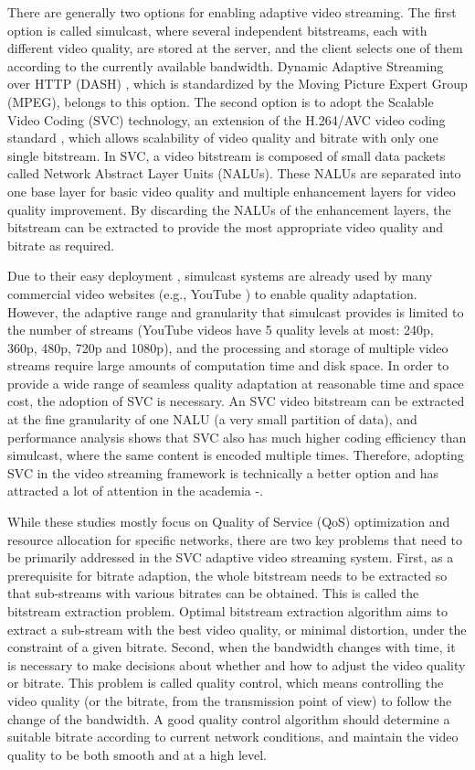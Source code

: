 \documentclass[journal]{IEEEtran}
\begin{document}
There are generally two options for enabling adaptive video streaming. The first option is called simulcast, where several independent bitstreams, each with different video quality, are stored at the server, and the client selects one of them according to the currently available bandwidth. Dynamic Adaptive Streaming over HTTP (DASH) \cite{DASH}, which is standardized by the Moving Picture Expert Group (MPEG), belongs to this option. The second option is to adopt the Scalable Video Coding (SVC) \cite{SVC} technology, an extension of the H.264/AVC video coding standard \cite{SVCOverview}, which allows scalability of video quality and bitrate with only one single bitstream. In SVC, a video bitstream is composed of small data packets called Network Abstract Layer Units (NALUs). These NALUs are separated into one base layer for basic video quality and multiple enhancement layers for video quality improvement. By discarding the NALUs of the enhancement layers, the bitstream can be extracted to provide the most appropriate video quality and bitrate as required.

Due to their easy deployment \cite{Bouten14}, simulcast systems are already used by many commercial video websites (e.g., YouTube \cite{YouTube}) to enable quality adaptation. However, the adaptive range and granularity that simulcast provides is limited to the number of streams (YouTube videos have 5 quality levels at most: 240p, 360p, 480p, 720p and 1080p), and the processing and storage of multiple video streams require large amounts of computation time and disk space. In order to provide a wide range of seamless quality adaptation at reasonable time and space cost, the adoption of SVC is necessary. An SVC video bitstream can be extracted at the fine granularity of one NALU (a very small partition of data), and performance analysis \cite{SVCPerformance} shows that SVC also has much higher coding efficiency than simulcast, where the same content is encoded multiple times. Therefore, adopting SVC in the video streaming framework is technically a better option and has attracted a lot of attention in the academia \cite{Chuah12}-\cite{Cicalo14}.

While these studies mostly focus on Quality of Service (QoS) optimization and resource allocation for specific networks, there are two key problems that need to be primarily addressed in the SVC adaptive video streaming system. First, as a prerequisite for bitrate adaption, the whole bitstream needs to be extracted so that sub-streams with various bitrates can be obtained. This is called the bitstream extraction problem. Optimal bitstream extraction algorithm aims to extract a sub-stream with the best video quality, or minimal distortion, under the constraint of a given bitrate. Second, when the bandwidth changes with time, it is necessary to make decisions about whether and how to adjust the video quality or bitrate. This problem is called quality control, which means controlling the video quality (or the bitrate, from the transmission point of view) to follow the change of the bandwidth. A good quality control algorithm should determine a suitable bitrate according to current network conditions, and maintain the video quality to be both smooth and at a high level.
\end{document}
